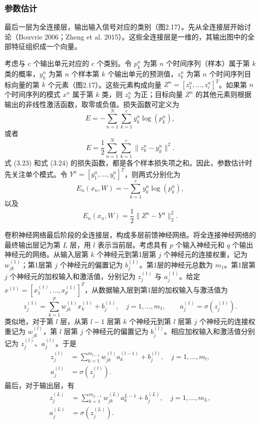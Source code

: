 \subsubsection{参数估计}

最后一层为全连接层，输出输入信号对应的类别（图2.17）。先从全连接层开始讨论（Bouvrie 2006；Zheng et al. 2015）。这些全连接层是一维的，其输出图中的全部特征组织成一个向量。

考虑与 $c$ 个输出单元对应的 $c$ 个类别。令 $p_k^n$ 为第 $n$ 个时间序列（样本）属于第 $k$ 类的概率，$y_k^n$ 为第 $n$ 个样本第 $k$ 个输出单元的预测值，$z_k^n$ 为第 $n$ 个时间序列目标向量的第 $k$ 个元素（图2.17）。这些元素构成向量 $Z^n=[z_1^n,\ldots,z_c^n]^T$。如果第 $n$ 个时间序列的模式 $x^n$ 属于第 $k$ 类，则 $z_k^n$ 为正；目标向量 $Z^n$ 的其他元素则根据输出的非线性激活函数，取零或负值。损失函数可定义为
\begin{equation}
E=-\sum_{n=1}^N\sum_{k=1}^cy_k^n\log(p_k^n),
\tag{3.23}
\end{equation}
或者
\begin{equation}
E=\frac12\sum_{n=1}^N\sum_{k=1}^c\|z_k^n-y_k^n\|^2.
\tag{3.24}
\end{equation}
式 (3.23) 和式 (3.24) 的损失函数，都是各个样本损失项之和。因此，参数估计时先关注单个模式。令 $Y^n=[y_1^n,\ldots,y_c^n]^T$，则两式分别化为
\begin{equation}
E_n(x_n,W)=-\sum_{k=1}^cy_k^n\log(p_k^n),
\tag{3.25}
\end{equation}
以及
\begin{equation}
E_n(x_n,W)=\frac12\|Z^n-Y^n\|_2^2.
\tag{3.26}
\end{equation}


卷积神经网络最后阶段的全连接层，构成多层前馈神经网络。将全连接神经网络的最终输出层记为第 $L$ 层，用 $l$ 表示当前层。考虑具有 $p$ 个输入神经元和 $q$ 个输出神经元的网络。从输入层第 $k$ 个神经元到第1层第 $j$ 个神经元的连接权重，记为 $w_{jk}^{(1)}$；第1层第 $j$ 个神经元的偏置记为 $b_j^{(1)}$。第1层的神经元总数为 $m_1$。第1层第 $j$ 个神经元的加权输入和激活值，分别记为 $z_j^{(1)}$ 与 $a_j^{(1)}$。给定 $x^{(1)}=[x_1^{(1)},\ldots,x_p^{(1)}]^T$，从数据输入层到第1层的加权输入与激活值为
\[
z_j^{(1)}=\sum_{k=1}^pw_{jk}^{(1)}x_k^{(1)}+b_j^{(1)},
\quad j=1,\ldots,m_1,
\qquad
a_j^{(1)}=\sigma(z_j^{(1)}).
\]
类似地，对于第 $l$ 层，从第 $l-1$ 层第 $k$ 个神经元到第 $l$ 层第 $j$ 个神经元的连接权重记为 $w_{jk}^{(l)}$，第 $l$ 层第 $j$ 个神经元的偏置记为 $b_j^{(l)}$。相应加权输入和激活值分别记为 $z_j^{(l)}$、$a_j^{(l)}$。于是
\[
\begin{aligned}
z_j^{(l)}&=\sum_{k=1}^{m_{l-1}}w_{jk}^{(l)}a_k^{(l-1)}+b_j^{(l)},
\quad j=1,\ldots,m_l,\\
a_j^{(l)}&=\sigma(z_j^{(l)}).
\end{aligned}
\]
最后，对于输出层，有
\[
\begin{aligned}
z_j^{(L)}&=\sum_{k=1}^{m_{L-1}}w_{jk}^{(L)}a_k^{L-1}+b_j^{(L)},
\quad j=1,\ldots,m_L,\\
a_j^{(L)}&=\sigma(z_j^{(L)}).
\end{aligned}
\]

